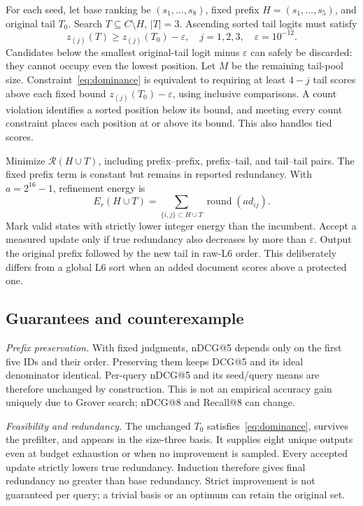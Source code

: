 \documentclass[conference]{IEEEtran}
\newcommand{\red}{\mathcal{R}}
\begin{document}
For each seed, let base ranking be \((s_1,\ldots,s_8)\), fixed prefix \(H=(s_1,\ldots,s_5)\), and original tail \(T_0\). Search \(T\subseteq C\setminus H\), \(|T|=3\). Ascending sorted tail logits must satisfy
\begin{equation}
z_{(j)}(T)\geq z_{(j)}(T_0)-\varepsilon,\quad j=1,2,3,\quad\varepsilon=10^{-12}.\label{eq:dominance}
\end{equation}
Candidates below the smallest original-tail logit minus \(\varepsilon\) can safely be discarded: they cannot occupy even the lowest position. Let \(M\) be the remaining tail-pool size. Constraint~\eqref{eq:dominance} is equivalent to requiring at least \(4-j\) tail scores above each fixed bound \(z_{(j)}(T_0)-\varepsilon\), using inclusive comparisons. A count violation identifies a sorted position below its bound, and meeting every count constraint places each position at or above its bound. This also handles tied scores.

Minimize \(\red(H\cup T)\), including prefix--prefix, prefix--tail, and tail--tail pairs. The fixed prefix term is constant but remains in reported redundancy. With \(a=2^{16}-1\), refinement energy is
\begin{equation}
E_r(H\cup T)=\sum_{\{i,j\}\subset H\cup T}\operatorname{round}(ad_{ij}).\label{eq:refine_energy}
\end{equation}
Mark valid states with strictly lower integer energy than the incumbent. Accept a measured update only if true redundancy also decreases by more than \(\varepsilon\). Output the original prefix followed by the new tail in raw-L6 order. This deliberately differs from a global L6 sort when an added document scores above a protected one.

\subsection{Guarantees and counterexample}
\textit{Prefix preservation.} With fixed judgments, nDCG@5 depends only on the first five IDs and their order. Preserving them keeps DCG@5 and its ideal denominator identical. Per-query nDCG@5 and its seed/query means are therefore unchanged by construction. This is not an empirical accuracy gain uniquely due to Grover search; nDCG@8 and Recall@8 can change.

\textit{Feasibility and redundancy.} The unchanged \(T_0\) satisfies~\eqref{eq:dominance}, survives the prefilter, and appears in the size-three basis. It supplies eight unique outputs even at budget exhaustion or when no improvement is sampled. Every accepted update strictly lowers true redundancy. Induction therefore gives final redundancy no greater than base redundancy. Strict improvement is not guaranteed per query; a trivial basis or an optimum can retain the original set.
\end{document}
